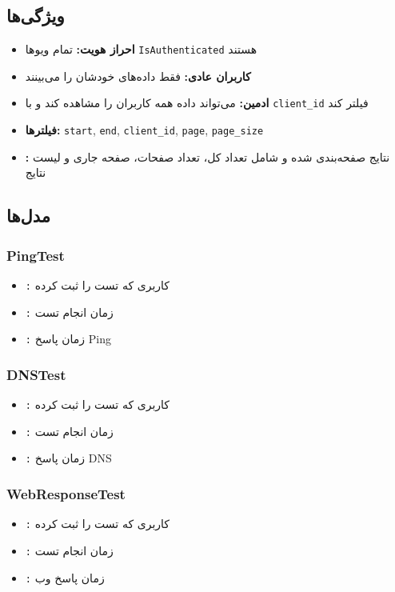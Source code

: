 \documentclass{report}
\begin{document}
\subsection{ویژگی‌ها}
\begin{itemize}
    \item \textbf{احراز هویت:} تمام ویوها \texttt{IsAuthenticated} هستند
    \item \textbf{کاربران عادی:} فقط داده‌های خودشان را می‌بینند
    \item \textbf{ادمین:} می‌تواند داده همه کاربران را مشاهده کند و با \texttt{client\_id} فیلتر کند
    \item \textbf{فیلترها:} \texttt{start}, \texttt{end}, \texttt{client\_id}, \texttt{page}, \texttt{page\_size}
    \item \textbf{:} نتایج صفحه‌بندی شده و شامل تعداد کل، تعداد صفحات، صفحه جاری و لیست نتایج
\end{itemize}

\subsection{مدل‌ها}
\subsubsection{PingTest}
\begin{itemize}
    \item \texttt{:} کاربری که تست را ثبت کرده
    \item \texttt{:} زمان انجام تست
    \item \texttt{:} زمان پاسخ Ping  
\end{itemize}

\subsubsection{DNSTest}
\begin{itemize}
    \item \texttt{:} کاربری که تست را ثبت کرده
    \item \texttt{:} زمان انجام تست
    \item \texttt{:} زمان پاسخ DNS  
\end{itemize}

\subsubsection{WebResponseTest}
\begin{itemize}
    \item \texttt{:} کاربری که تست را ثبت کرده 
    \item \texttt{:} زمان انجام تست
    \item \texttt{:} زمان پاسخ وب  
\end{itemize}
\end{document}
